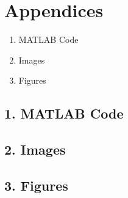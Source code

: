 \documentclass[11pt]{article}
\begin{document}
\section{Appendices}


\begin{enumerate}
    \item MATLAB Code
    \item Images
    \item Figures %
\end{enumerate}

\subsection{1. MATLAB Code}



\subsection{2. Images}


\subsection{3. Figures}
\end{document}
